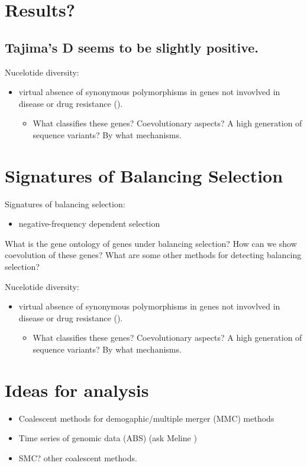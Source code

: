 \documentclass[11pt]{article}
\begin{document}
\section{Results?}
\label{sec:org49330f4}
\subsection{Tajima's D seems to be slightly positive.}
\label{sec:org224d229}
Nucelotide diversity:
\begin{itemize}
\item virtual absence of synonymous polymorphisms in genes not invovlved in disease or drug resistance (\cite{rich-2000-popul-struc}).
\begin{itemize}
\item What classifies these genes? Coevolutionary aspects? A high generation of sequence variants? By what mechanisms.
\end{itemize}
\end{itemize}

\section{Signatures of Balancing Selection}
\label{sec:orgd5735c2}
Signatures of balancing selection:
\begin{itemize}
\item negative-frequency dependent selection
\end{itemize}

What is the gene ontology of genes under balancing selection? How can we show coevolution of these genes? What are some other methods for detecting balancing selection?

Nucelotide diversity:
\begin{itemize}
\item virtual absence of synonymous polymorphisms in genes not invovlved in disease or drug resistance (\cite{rich-2000-popul-struc}).
\begin{itemize}
\item What classifies these genes? Coevolutionary aspects? A high generation of sequence variants? By what mechanisms.
\end{itemize}
\end{itemize}

\section{Ideas for analysis}
\label{sec:orge4f9684}
\begin{itemize}
\item Coalescent methods for demogaphic/multiple merger (MMC) methods
\cite{korfmann-2023-simul-infer}

\item Time series of genomic data (ABS) (ask  Meline )
\item SMC? other coalescent methods.
\end{itemize}
\end{document}
